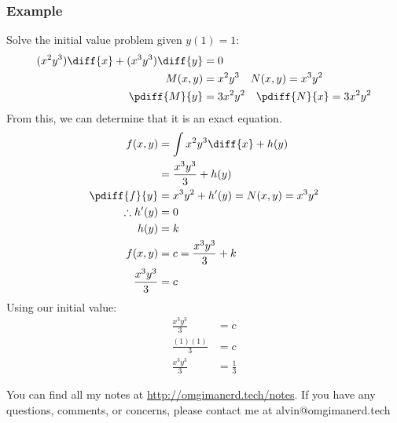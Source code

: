 \documentclass{math}
\begin{document}
\subsubsection*{Example}
Solve the initial value problem given \( y(1) = 1 \):
\begin{align*}
  (x^2y^3)\diff{x}+(x^3y^3)\diff{y} &= 0 \\
  M(x,y) &= x^2y^3 \quad N(x,y) = x^3y^2 \\
  \pdiff{M}{y} &= 3x^2y^2 \quad \pdiff{N}{x} = 3x^2y^2
\end{align*}
From this, we can determine that it is an exact equation.
\begin{align*}
  f(x,y) &= \int x^2y^3\diff{x}+h(y) \\
  &= \frac{x^3y^3}{3}+h(y) \\
  \pdiff{f}{y} &= x^3y^2+h'(y) = N(x,y) = x^3y^2 \\
  \therefore h'(y) &= 0 \\
  h(y) &= k \\
  f(x,y) &= c = \frac{x^3y^3}{3}+k \\
  \frac{x^3y^3}{3} &= c
\end{align*}
Using our initial value:
\begin{align*}
  \frac{x^3y^3}{3} &= c \\
  \frac{(1)(1)}{3} &= c \\
  \frac{x^3y^3}{3} &= \frac{1}{3}
\end{align*}

\begin{center}
  You can find all my notes at \url{http://omgimanerd.tech/notes}. If you have
  any questions, comments, or concerns, please contact me at
  alvin@omgimanerd.tech
\end{center}
\end{document}
